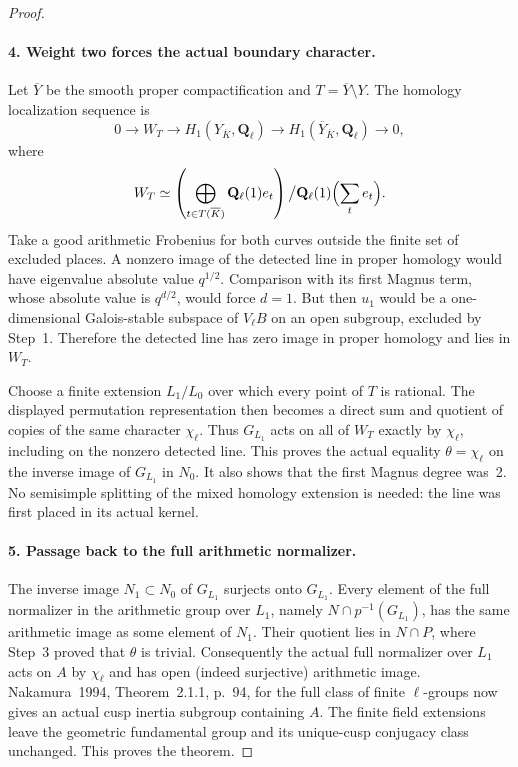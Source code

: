 \begin{proof}
\paragraph{4. Weight two forces the actual boundary character.}
Let $\overline Y$ be the smooth proper compactification and
$T=\overline Y\setminus Y$. The homology localization sequence is
\[
 0\longrightarrow W_T\longrightarrow
 H_1(Y_{\overline K},\mathbf Q_\ell)
 \longrightarrow H_1(\overline Y_{\overline K},\mathbf Q_\ell)
 \longrightarrow0,
\]
where
\[
 W_T\simeq\left(\bigoplus_{t\in T(\overline K)}
                    \mathbf Q_\ell(1)e_t\right)
          \big/\mathbf Q_\ell(1)\Bigl(\sum_t e_t\Bigr).
\]
Take a good arithmetic Frobenius for both curves outside the
finite set of excluded places. A nonzero image of the detected
line in proper homology would have eigenvalue absolute value
$q^{1/2}$. Comparison with its first Magnus term, whose
absolute value is $q^{d/2}$, would force $d=1$. But then
$u_1$ would be a one-dimensional Galois-stable subspace of
$V_\ell B$ on an open subgroup, excluded by Step~1.
Therefore the detected line has zero image in proper homology
and lies in $W_T$.

Choose a finite extension $L_1/L_0$ over which every point of
$T$ is rational. The displayed permutation representation
then becomes a direct sum and quotient of copies of the
same character $\chi_\ell$. Thus $G_{L_1}$ acts on all of
$W_T$ exactly by $\chi_\ell$, including on the nonzero
detected line. This proves the actual equality
$\theta=\chi_\ell$ on the inverse image of $G_{L_1}$ in $N_0$.
It also shows that the first Magnus degree was~2. No
semisimple splitting of the mixed homology extension is
needed: the line was first placed in its actual kernel.

\paragraph{5. Passage back to the full arithmetic normalizer.}
The inverse image $N_1\subset N_0$ of $G_{L_1}$ surjects
onto $G_{L_1}$. Every element of the full normalizer in the
arithmetic group over $L_1$, namely
$N\cap p^{-1}(G_{L_1})$, has the same arithmetic image as
some element of $N_1$. Their quotient lies in $N\cap P$,
where Step~3 proved that $\theta$ is trivial. Consequently
the actual full normalizer over $L_1$ acts on $A$ by
$\chi_\ell$ and has open (indeed surjective) arithmetic image.
Nakamura~1994, Theorem~2.1.1, p.~94, for the full class of finite\cite{AuditNakamura1994}
$\ell$-groups now gives an actual cusp inertia subgroup
containing $A$. The finite field extensions leave the
geometric fundamental group and its unique-cusp conjugacy
class unchanged. This proves the theorem.


\end{proof}
